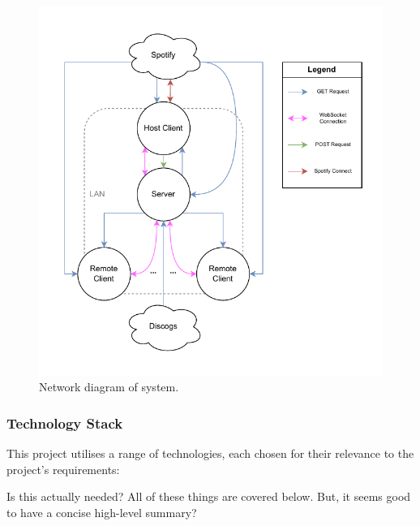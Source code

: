                 \begin{figure}[h]
                    \centering
                    \includegraphics[width=\textwidth]{images/VTT_network.NetworkDiagram.pdf}
                    \caption{Network diagram of system. }
                    \label{fig:networkDiagram}
                \end{figure}
        
            \subsubsection{Technology Stack}
    
                This project utilises a range of technologies, each chosen for their relevance to the project’s requirements:
    
                \begin{temp}
                    Is this actually needed? All of these things are covered below. But, it seems good to have a concise high-level summary?
                \end{temp}
                
